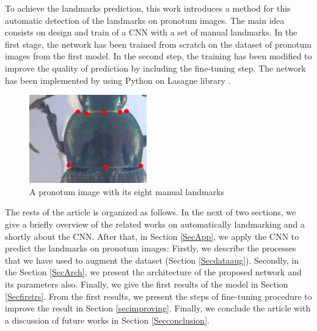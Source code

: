 \documentclass{article} %
\begin{document}
\begin{multicols}{2}
To achieve the landmarks prediction, this work introduces a method for this automatic detection of the landmarks on pronotum images. The main idea consists on design and train of a CNN \cite{lecun2010convolutional} with a set of manual landmarks. In the first stage, the network has been trained from scratch on the dataset of pronotum images from the first model. In the second step, the training has been modified to improve the quality of prediction by including the fine-tuning\cite{torrey2009transfer} step. The network has been implemented by using Python on Lasagne library \cite{lasagne}.

\begin{figure}[H]
	\centering
	\includegraphics[height=1.5in]{images/pronotum.jpg}
	\caption{\footnotesize{A pronotum image with its eight manual landmarks}}
	\label{figmlm}
\end{figure}

The rests of the article is organized as follows. In the next of two sections, we give a briefly overview of the related works on automatically landmarking and a shortly about the CNN. After that, in Section \ref{SecApp}, we apply the CNN to predict the landmarks on pronotum images: Firstly, we describe the processes that we have used to augment the dataset (Section \ref{Secdataaug}). Secondly, in the Section \ref{SecArch}, we present the architecture of the proposed network and its parameters also. Finally, we give the first results of the model in Section \ref{Secfirstrs}. From the first results, we present the steps of fine-tuning procedure to improve the result in Section \ref{secimproving}. Finally, we conclude the article with a discussion of future works in Section \ref{Secconclusion}.


\end{multicols}
\end{document}
